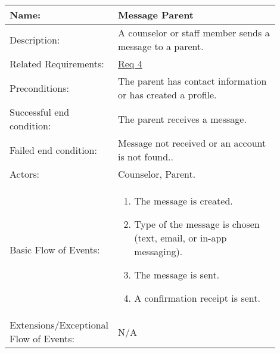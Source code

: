 \documentclass[11pt]{article}
\begin{document}
\begin{table}[!htb]
\begin{center}
\begin{tabular}{p{0.30\linewidth}p{0.60\linewidth}}
	Name: & Message Parent\\\hline
	Description: & A counselor or staff member sends a message to a parent.\\\hline
	Related Requirements:& \hyperlink{Req4}{Req 4}\\\hline
	Preconditions:& The parent has contact information or has created a profile.\\\hline
	Successful end condition:& The parent receives a message.\\\hline
	Failed end condition:& Message not received or an account is not found.. \\\hline
	Actors:& Counselor, Parent.\\\hline
	Basic Flow of Events: & \begin{enumerate}[topsep=0pt]
		\item The message is created.
		\item Type of the message is chosen (text, email, or in-app messaging).
		\item The message is sent.
		\item A confirmation receipt is sent.
	\end{enumerate}\\\hline
	Extensions/Exceptional Flow of Events: & \vspace*{.25em}  N/A
\end{tabular}
\label{des:message parent}	
\end{center}
\end{table}

\end{document}
